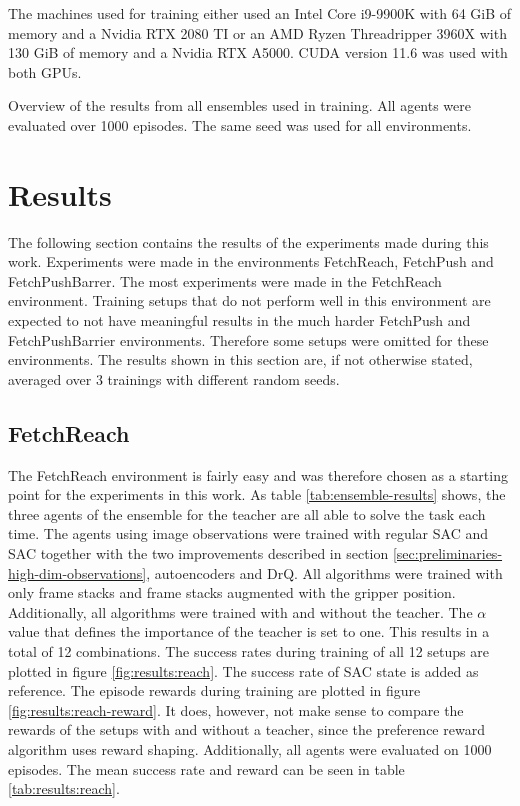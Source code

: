 The machines used for training either used an Intel Core i9-9900K with 64 GiB of memory and a Nvidia RTX 2080 TI or an AMD Ryzen Threadripper 3960X with 130 GiB of memory and a Nvidia RTX A5000. CUDA version 11.6 was used with both GPUs.

\begin{table}[btp]
	\centering
	
	\caption[Overview of the results from all ensembles used in training.]{Overview of the results from all ensembles used in training. All agents were evaluated over 1000 episodes. The same seed was used for all environments.}
	\label{tab:ensemble-results}
\end{table}

\section{Results}
\label{sec:experiments:results}

The following section contains the results of the experiments made during this work. Experiments were made in the environments FetchReach, FetchPush and FetchPushBarrer. The most experiments were made in the FetchReach environment. Training setups that do not perform well in this environment are expected to not have meaningful results in the much harder FetchPush and FetchPushBarrier environments. Therefore some setups were omitted for these environments. The results shown in this section are, if not otherwise stated, averaged over 3 trainings with different random seeds.

\subsection{FetchReach}
\label{sec:results:fetch-reach}

The FetchReach environment is fairly easy and was therefore chosen as a starting point for the experiments in this work. As table \ref{tab:ensemble-results} shows, the three agents of the ensemble for the teacher are all able to solve the task each time. The agents using image observations were trained with regular SAC and SAC together with the two improvements described in section \ref{sec:preliminaries-high-dim-observations}, autoencoders and DrQ. All algorithms were trained with only frame stacks and frame stacks augmented with the gripper position. Additionally, all algorithms were trained with and without the teacher. The $\alpha$ value that defines the importance of the teacher is set to one. This results in a total of 12 combinations. The success rates during training of all 12 setups are plotted in figure \ref{fig:results:reach}. The success rate of SAC state is added as reference. The episode rewards during training are plotted in figure \ref{fig:results:reach-reward}. It does, however, not make sense to compare the rewards of the setups with and without a teacher, since the preference reward algorithm uses reward shaping. Additionally, all agents were evaluated on 1000 episodes. The mean success rate and reward can be seen in table \ref{tab:results:reach}.


